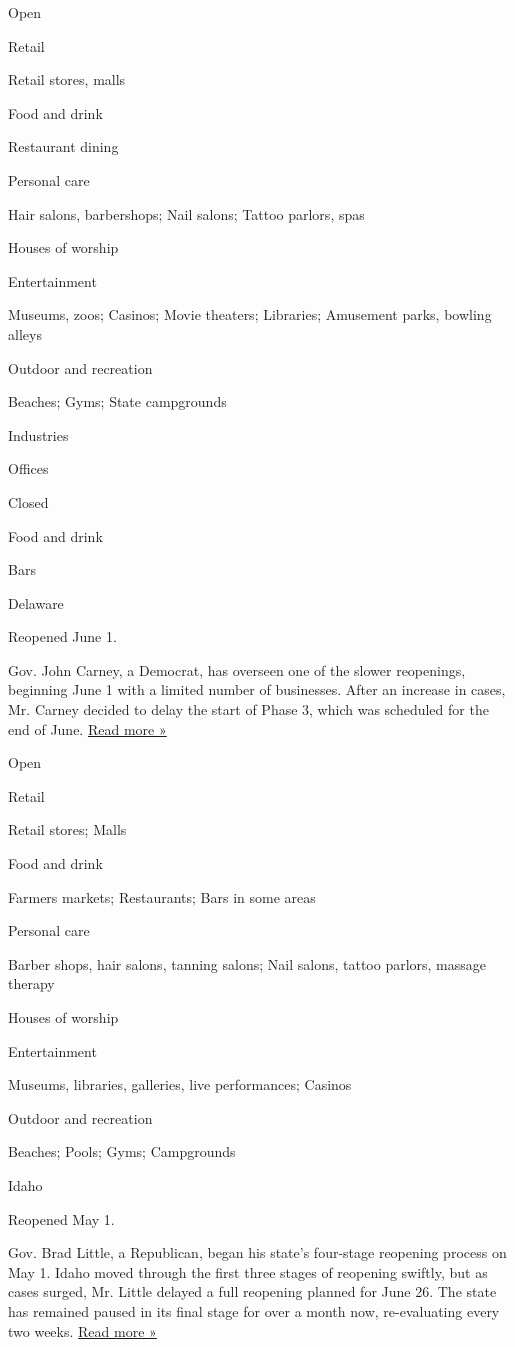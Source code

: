 Open

Retail

Retail stores, malls

Food and drink

Restaurant dining

Personal care

Hair salons, barbershops; Nail salons; Tattoo parlors, spas

Houses of worship

Entertainment

Museums, zoos; Casinos; Movie theaters; Libraries; Amusement parks,
bowling alleys

Outdoor and recreation

Beaches; Gyms; State campgrounds

Industries

Offices

Closed

Food and drink

Bars

Delaware

Reopened June 1.

Gov. John Carney, a Democrat, has overseen one of the slower reopenings,
beginning June 1 with a limited number of businesses. After an increase
in cases, Mr. Carney decided to delay the start of Phase 3, which was
scheduled for the end of June.
\href{https://www.delawareonline.com/story/news/coronavirus-in-delaware/2020/06/25/delaware-wont-go-into-phase-3-monday-gov-john-carney-says-coronavirus-delaware-reopen-covid-19/3260541001/}{Read
more »}

Open

Retail

Retail stores; Malls

Food and drink

Farmers markets; Restaurants; Bars in some areas

Personal care

Barber shops, hair salons, tanning salons; Nail salons, tattoo parlors,
massage therapy

Houses of worship

Entertainment

Museums, libraries, galleries, live performances; Casinos

Outdoor and recreation

Beaches; Pools; Gyms; Campgrounds

Idaho

Reopened May 1.

Gov. Brad Little, a Republican, began his state's four-stage reopening
process on May 1. Idaho moved through the first three stages of
reopening swiftly, but as cases surged, Mr. Little delayed a full
reopening planned for June 26. The state has remained paused in its
final stage for over a month now, re-evaluating every two weeks.
\href{https://www.kmvt.com/2020/08/06/gov-brad-little-to-hold-press-conference-on-idaho-reopening-opening-of-schools/}{Read
more »}

